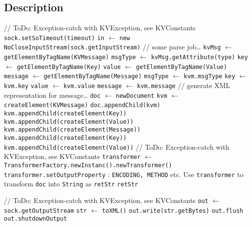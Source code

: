 \documentclass{article}
\begin{document}
\subsection{Description}
\begin{algorithm}
	\begin{algorithmic}
			\State // ToDo: Exception-catch with KVException, see KVConstants
			\State \texttt{sock.setSoTimeout(timeout)}
			\State \texttt{in} $\leftarrow$ \texttt{new NoCloseInputStream(sock.getInputStream)}
			\State // some parse job\dots
			\State \texttt{kvMsg} $\leftarrow$ \texttt{getElementByTagName(KVMessage)}
			\State \texttt{msgType} $\leftarrow$ \texttt{kvMsg.getAttribute(type)}
			\State \texttt{key} $\leftarrow$ \texttt{getElementByTagName(Key)}
			\State \texttt{value} $\leftarrow$ \texttt{getElementByTagName(Value)}
			\State \texttt{message} $\leftarrow$ \texttt{getElementByTagName(Message)}
		\EndProcedure
			\State \texttt{msgType} $\leftarrow$ \texttt{kvm.msgType}
			\State \texttt{key} $\leftarrow$ \texttt{kvm.key}
			\State \texttt{value} $\leftarrow$ \texttt{kvm.value}
			\State \texttt{message} $\leftarrow$ \texttt{kvm.message}
		\EndProcedure
			\State // generate XML representation for message\dots
			\State \texttt{doc} $\leftarrow$ \texttt{newDocument}
			\State \texttt{kvm} $\leftarrow$ \texttt{createElement(KVMessage)}
			\State \texttt{doc.appendChild(kvm)}
					\State \texttt{kvm.appendChild(createElement(Key))}
				\EndIf
					\State \texttt{kvm.appendChild(createElement(Value))}
				\EndIf
					\State \texttt{kvm.appendChild(createElement(Message))}
				\EndIf
			\Else
				\State \texttt{kvm.appendChild(createElement(Key))}
					\State \texttt{kvm.appendChild(createElement(Value))}
					\State // ToDo: Exception-catch with KVException, see KVConstants
				\EndIf
			\EndIf
			\State \texttt{transformer} $\leftarrow$ \texttt{TransformerFactory.newInstanc().newTransformer()}
			\State \texttt{transformer.setOutputProperty} : \texttt{ENCODING, METHOD} etc.
			\State Use \texttt{transformer} to transform \texttt{doc} into \texttt{String} as \texttt{retStr}
			\State \Return \texttt{retStr}
		\EndProcedure
	\end{algorithmic}
\end{algorithm}
\begin{algorithm}
	\begin{algorithmic}
		\Procedure{sendMessage}{Socket sock}
			\State // ToDo: Exception-catch with KVException, see KVConstants
			\State \texttt{out} $\leftarrow$ \texttt{sock.getOutputStream}
			\State \texttt{str} $\leftarrow$ \texttt{toXML()}
			\State \texttt{out.write(str.getBytes)}
			\State \texttt{out.flush}
			\State \texttt{out.shutdownOutput}
		\EndProcedure
	\end{algorithmic}
\end{algorithm}
\end{document}
